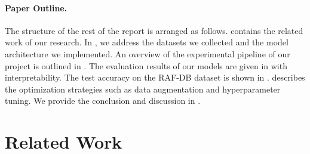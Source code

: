 \paragraph{Paper Outline.}
The structure of the rest of the report is arranged as follows. 
 contains the related work of our research. 
In , 
we address the datasets we collected and the model architecture we implemented. 
An overview of the experimental pipeline of our project is outlined in . 
The evaluation results of our models are given in  with interpretability. 
The test accuracy on the RAF-DB dataset is shown in . 
 describes the optimization strategies such as data augmentation and hyperparameter tuning. 
We provide the conclusion and discussion in . 

\section{Related Work}
\label{sec:related}


